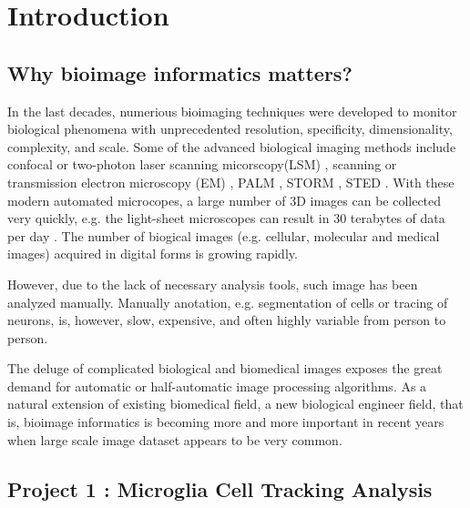 \chapter{Introduction}
\section{Why bioimage informatics matters?}
In the last decades, numerious bioimaging techniques were developed to monitor biological phenomena with unprecedented resolution, specificity, dimensionality, complexity, and scale. Some of the advanced biological imaging methods include confocal or two-photon laser scanning micorscopy(LSM) \cite{pawley1995handbook}, scanning or transmission electron microscopy (EM) \cite{bozzola1999electron}, PALM \cite{betzig2006imaging}, STORM \cite{rust2006sub}, STED \cite{hell2003toward}. With these modern automated microcopes, a large number of 3D images can be collected very quickly, e.g. the light-sheet microscopes can result in 30 terabytes of data per day \cite{keller2008reconstruction}. The number of biogical images (e.g. cellular, molecular and medical images) acquired in digital forms is growing rapidly. 

However, due to the lack of necessary analysis tools, such image has been analyzed manually. Manually anotation, e.g. segmentation of cells or tracing of neurons, is, however, slow, expensive, and often highly variable from person to person.

The deluge of complicated biological and biomedical images exposes the great demand for automatic or half-automatic image processing algorithms. As a natural extension of existing biomedical field, a new biological engineer field, that is, bioimage informatics is becoming more and more important in recent years when large scale image dataset appears to be very common.


\section{Project 1 : Microglia Cell Tracking Analysis}
